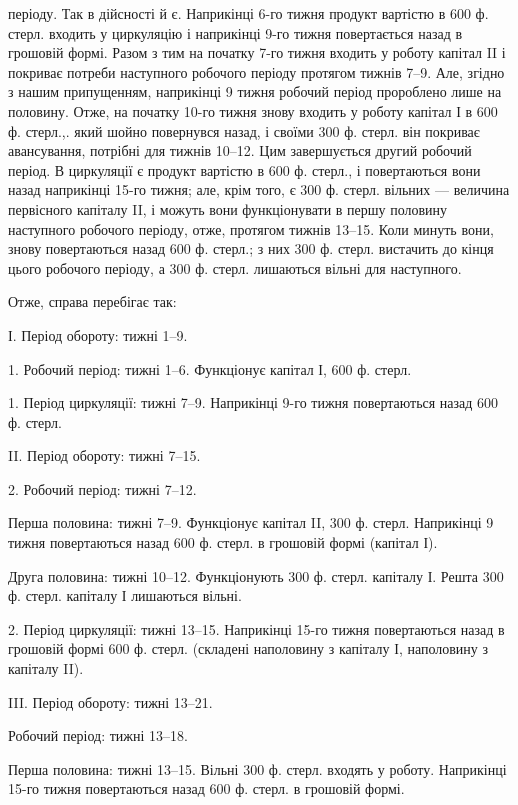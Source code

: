 \parcont{}  %
періоду. Так в дійсності й є. Наприкінці 6-го тижня продукт вартістю
в 600 ф. стерл. входить у циркуляцію і наприкінці 9-го тижня повертається
назад в грошовій формі. Разом з тим на початку 7-го тижня
входить у роботу капітал II і покриває потреби наступного робочого
періоду протягом тижнів 7--9. Але, згідно з нашим припущенням, наприкінці
9 тижня робочий період пророблено лише на половину. Отже, на
початку 10-го тижня знову входить у роботу капітал І в 600 ф. стерл.,.
який шойно повернувся назад, і своїми 300 ф. стерл. він покриває авансування,
потрібні для тижнів 10--12. Цим завершується другий робочий
період. В циркуляції є продукт вартістю в 600 ф. стерл., і повертаються
вони назад наприкінці 15-го тижня; але, крім того, є 300 ф. стерл.
вільних — величина первісного капіталу II, і можуть вони функціонувати
в першу половину наступного робочого періоду, отже, протягом тижнів
13--15. Коли минуть вони, знову повертаються назад 600 ф. стерл.;
з них 300 ф. стерл. вистачить до кінця цього робочого періоду, а
300 ф. стерл. лишаються вільні для наступного.

Отже, справа перебігає так:

І. Період обороту: тижні 1--9.

1. Робочий період: тижні 1--6. Функціонує капітал І, 600 ф. стерл.

1. Період циркуляції: тижні 7--9. Наприкінці 9-го тижня повертаються
назад 600 ф. стерл.

II. Період обороту: тижні 7--15.

2. Робочий період: тижні 7--12.

Перша половина: тижні 7--9. Функціонує капітал II, 300 ф. стерл.
Наприкінці 9 тижня повертаються назад 600 ф. стерл. в грошовій формі
(капітал І).

Друга половина: тижні 10--12. Функціонують 300 ф. стерл. капіталу
І. Решта 300 ф. стерл. капіталу І лишаються вільні.

2. Період циркуляції: тижні 13--15. Наприкінці 15-го тижня повертаються
назад в грошовій формі 600 ф. стерл. (складені наполовину
з капіталу І, наполовину з капіталу II).

III. Період обороту: тижні 13--21.

Робочий період: тижні 13--18.

Перша половина: тижні 13--15. Вільні 300 ф. стерл. входять у
роботу. Наприкінці 15-го тижня повертаються назад 600 ф. стерл. в грошовій
формі.

